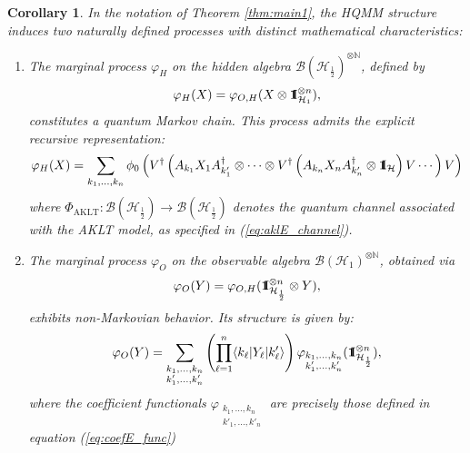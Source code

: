 \documentclass[12pt,a4paper]{article}
\newtheorem{corollary}[theorem]{Corollary}
\def\id{{\bf 1}\!\!{\rm I}}
\begin{document}
\begin{corollary}\label{cor:extended_hidden_markov}
In the notation of Theorem \ref{thm:main1}, the HQMM structure induces two naturally defined processes with distinct mathematical characteristics:

\begin{enumerate}
\item  The marginal process $\varphi_H$ on the hidden algebra $\mathcal{B}(\mathcal{H}_{\frac{1}{2}})^{\otimes \mathbb{N}}$, defined by
\[
\varphi_H(X) = \varphi_{O,H}(X \otimes \id_{\mathcal{H}_{1}}^{\otimes n}),
\]
constitutes a \emph{quantum Markov chain}. This process admits the explicit recursive representation:
\begin{equation}\label{eq:phiH}
\varphi_H(X) =  \sum_{ k_1,\dots,k_n} \phi_0 \left( V^{\dagger} \left( A_{k_1}X_1 A_{k'_1}^\dagger \otimes  \cdots \otimes V^{\dagger}\left( A_{k_n}X_n A_{k'_n}^\dagger \otimes \id_{\mathcal{H}} \right)V \cdots \right)V \right)
\end{equation}
where $\Phi_{\mathrm{AKLT}}: \mathcal{B}(\mathcal{H}_{\frac{1}{2}})\to \mathcal{B}(\mathcal{H}_{\frac{1}{2}})$ denotes the quantum channel associated with the AKLT model, as specified in (\ref{eq:aklE_channel}).

\item  The marginal process $\varphi_O$ on the observable algebra $\mathcal{B}(\mathcal{H}_{1})^{\otimes \mathbb{N}}$, obtained via
\begin{equation*}
\varphi_O(Y) = \varphi_{O,H}(\id_{\mathcal{H}_{\frac{1}{2}}}^{\otimes n} \otimes Y),
\end{equation*}
exhibits \emph{non-Markovian} behavior. Its structure is given by:
\begin{equation}\label{eq:phiO}
\varphi_O(Y) = \sum_{\substack{k_1,\dots,k_n \\ k'_1,\dots,k'_n}} \left( \prod_{\ell=1}^n \langle k_\ell | Y_\ell | k'_\ell \rangle \right) \varphi_{\substack{k_1,\dots,k_n \\ k'_1,\dots,k'_n}}(\id_{\mathcal{H}_{\frac{1}{2}}}^{\otimes n}),
\end{equation}
where the coefficient functionals $\varphi_{\substack{k_1,\dots,k_n \\ k'_1,\dots,k'_n}}$ are precisely those defined in equation (\ref{eq:coefE_func})
\end{enumerate}
\end{corollary}
\end{document}
